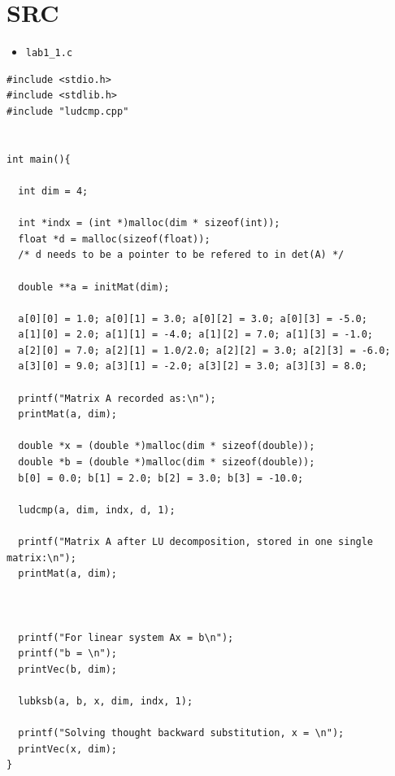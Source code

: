 \documentclass{article}
\begin{document}
\pagebreak
\section{SRC}
\label{sec-3}

\begin{itemize}
\item \texttt{lab1\_1.c}
\end{itemize}
\hline
\begin{verbatim}
#include <stdio.h>
#include <stdlib.h>
#include "ludcmp.cpp"


int main(){

  int dim = 4;

  int *indx = (int *)malloc(dim * sizeof(int));
  float *d = malloc(sizeof(float));
  /* d needs to be a pointer to be refered to in det(A) */

  double **a = initMat(dim);

  a[0][0] = 1.0; a[0][1] = 3.0; a[0][2] = 3.0; a[0][3] = -5.0;
  a[1][0] = 2.0; a[1][1] = -4.0; a[1][2] = 7.0; a[1][3] = -1.0;
  a[2][0] = 7.0; a[2][1] = 1.0/2.0; a[2][2] = 3.0; a[2][3] = -6.0;
  a[3][0] = 9.0; a[3][1] = -2.0; a[3][2] = 3.0; a[3][3] = 8.0;

  printf("Matrix A recorded as:\n");
  printMat(a, dim);

  double *x = (double *)malloc(dim * sizeof(double));
  double *b = (double *)malloc(dim * sizeof(double));
  b[0] = 0.0; b[1] = 2.0; b[2] = 3.0; b[3] = -10.0;

  ludcmp(a, dim, indx, d, 1);

  printf("Matrix A after LU decomposition, stored in one single matrix:\n");
  printMat(a, dim);



  printf("For linear system Ax = b\n");
  printf("b = \n");
  printVec(b, dim);

  lubksb(a, b, x, dim, indx, 1);

  printf("Solving thought backward substitution, x = \n");
  printVec(x, dim);
}
\end{verbatim}

\hline
\end{document}
